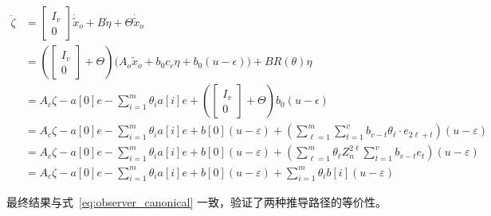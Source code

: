 \documentclass[12pt,a4paper]{article}
\begin{document}
\begin{align*}
\dot{\zeta}
&= \begin{bmatrix} I_v \\ 0 \end{bmatrix} \dot{\tilde{x}}_o + B\dot{\eta} + \Theta \dot{\tilde{x}}_o \\
&= \left(\begin{bmatrix} I_v \\ 0 \end{bmatrix} + \Theta\right)
\bigl(A_o \tilde{x}_o + b_0 c_c \eta + b_0(u-\epsilon)\bigr) + B R(\theta) \eta \\
&= A_c\zeta - a[0] e - \sum_{i=1}^m \theta_i a[i]e
+ \left(\begin{bmatrix} I_v \\ 0 \end{bmatrix} + \Theta\right)b_0(u-\epsilon) \\
&= A_c\zeta - a[0] e - \sum_{i=1}^m \theta_i a[i]e
+ b[0](u-\varepsilon)
+ \left(\sum_{\ell=1}^{m} \sum_{t=1}^{v} b_{v-t}\theta_\ell\cdot e_{2\ell+t} \right) (u-\varepsilon) \\
&= A_c\zeta - a[0] e - \sum_{i=1}^m \theta_i a[i]e
+ b[0](u-\varepsilon)
+ \left( \sum_{\ell=1}^{m} \theta_\ell Z_n^{2\ell} \sum_{t=1}^{v} b_{v-t} e_{t} \right) (u-\varepsilon) \\
&= A_c\zeta - a[0] e - \sum_{i=1}^m \theta_i a[i]e
+ b[0](u-\varepsilon)
+ \sum_{i=1}^{m} \theta_i b[i] (u-\varepsilon)
\end{align*}

最终结果与式~\eqref{eq:observer_canonical} 一致，验证了两种推导路径的等价性。
\end{document}
